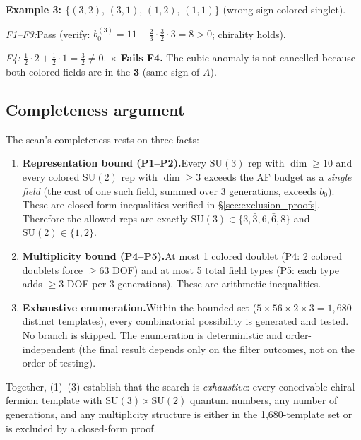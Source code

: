 \documentclass[11pt,a4paper]{article}
\theoremstyle{definition}
\newcommand{\SU}{\mathrm{SU}}
\begin{document}
\bigskip
\noindent\textbf{Example 3: $\{(3,2),\, (3,1),\, (1,2),\, (1,1)\}$}
(wrong-sign colored singlet).

\smallskip\noindent\textit{F1--F3:}\quad Pass (verify: $b_0^{(3)} = 11
- \tfrac{2}{3}\!\cdot\!\tfrac{3}{2}\!\cdot\!3 = 8 > 0$; chirality
holds).

\smallskip\noindent\textit{F4:}\quad
$\tfrac{1}{2}\!\cdot\!2 + \tfrac{1}{2}\!\cdot\!1 = \tfrac{3}{2}
\ne 0$.  $\boldsymbol{\times}$ \textbf{Fails F4.}  The cubic anomaly is not
cancelled because both colored fields are in the $\mathbf{3}$ (same
sign of $A$).

\subsection{Completeness argument}
\label{app:completeness}

The scan's completeness rests on three facts:

\begin{enumerate}[nosep]
\item \textbf{Representation bound (P1--P2).}\quad Every $\SU(3)$ rep
with $\dim \ge 10$ and every colored $\SU(2)$ rep with $\dim \ge 3$
exceeds the AF budget as a \emph{single field} (the cost of one such
field, summed over 3 generations, exceeds $b_0$).  These are
closed-form inequalities verified in \S\ref{sec:exclusion_proofs}.
Therefore the allowed reps are exactly
$\SU(3) \in \{3,\bar{3},6,\bar{6},8\}$ and $\SU(2) \in \{1,2\}$.

\item \textbf{Multiplicity bound (P4--P5).}\quad At most 1 colored
doublet (P4: 2 colored doublets force $\ge 63$ DOF) and at most 5
total field types (P5: each type adds $\ge 3$ DOF per 3 generations).
These are arithmetic inequalities.

\item \textbf{Exhaustive enumeration.}\quad Within the bounded set
($5 \times 56 \times 2 \times 3 = 1{,}680$ distinct templates), every
combinatorial possibility is generated and tested.  No branch is
skipped.  The enumeration is deterministic and order-independent (the
final result depends only on the filter outcomes, not on the order
of testing).
\end{enumerate}

\noindent Together, (1)--(3) establish that the search is
\emph{exhaustive}: every conceivable chiral fermion template with
$\SU(3) \times \SU(2)$ quantum numbers, any number of generations,
and any multiplicity structure is either in the 1{,}680-template set or
is excluded by a closed-form proof.
\end{document}
